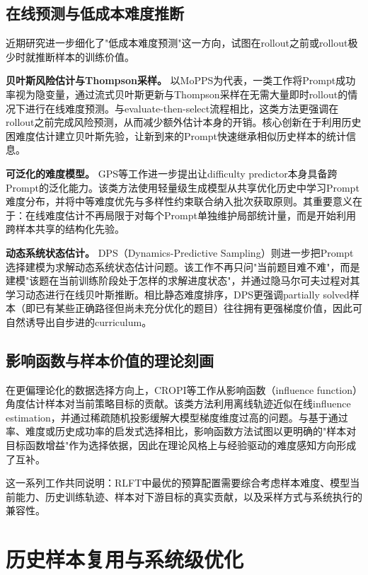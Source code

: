 \subsection{在线预测与低成本难度推断}
\label{subsec:online_difficulty_prediction}

近期研究进一步细化了"低成本难度预测"这一方向，试图在rollout之前或rollout极少时就推断样本的训练价值。

\textbf{贝叶斯风险估计与Thompson采样。} 以MoPPS为代表，一类工作将Prompt成功率视为隐变量，通过流式贝叶斯更新与Thompson采样在无需大量即时rollout的情况下进行在线难度预测。与evaluate-then-select流程相比，这类方法更强调在rollout之前完成风险预测，从而减少额外估计本身的开销。核心创新在于利用历史困难度估计建立贝叶斯先验，让新到来的Prompt快速继承相似历史样本的统计信息。

\textbf{可泛化的难度模型。} GPS等工作进一步提出让difficulty predictor本身具备跨Prompt的泛化能力。该类方法使用轻量级生成模型从共享优化历史中学习Prompt难度分布，并将中等难度优先与多样性约束联合纳入批次获取原则。其重要意义在于：在线难度估计不再局限于对每个Prompt单独维护局部统计量，而是开始利用跨样本共享的结构化先验。

\textbf{动态系统状态估计。} DPS（Dynamics-Predictive Sampling）则进一步把Prompt选择建模为求解动态系统状态估计问题。该工作不再只问"当前题目难不难"，而是建模"该题在当前训练阶段处于怎样的求解进度状态"，并通过隐马尔可夫过程对其学习动态进行在线贝叶斯推断。相比静态难度排序，DPS更强调partially solved样本（即已有某些正确路径但尚未充分优化的题目）往往拥有更强梯度价值，因此可自然诱导出自步进的curriculum。

\subsection{影响函数与样本价值的理论刻画}
\label{subsec:influence_function}

在更偏理论化的数据选择方向上，CROPI等工作从影响函数（influence function）角度估计样本对当前策略目标的贡献。该类方法利用离线轨迹近似在线influence estimation，并通过稀疏随机投影缓解大模型梯度维度过高的问题。与基于通过率、难度或历史成功率的启发式选择相比，影响函数方法试图以更明确的"样本对目标函数增益"作为选择依据，因此在理论风格上与经验驱动的难度感知方向形成了互补。

这一系列工作共同说明：RLFT中最优的预算配置需要综合考虑样本难度、模型当前能力、历史训练轨迹、样本对下游目标的真实贡献，以及采样方式与系统执行的兼容性。

\section{历史样本复用与系统级优化}
\label{sec:sample_reuse_and_system}

